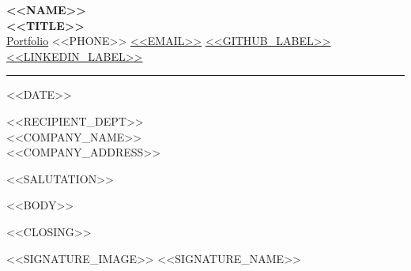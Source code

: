 \documentclass[a4paper,11pt]{letter}
\begin{document}

\begin{center}
    \textbf{\Large{<<NAME>>}} \\
    \textbf{\MakeUppercase{<<TITLE>>}} \\
    \faGlobe \hspace{2pt} \href{<<PORTFOLIO_URL>>}{Portfolio} \hspace{3pt}
    \faPhone \hspace{2pt} <<PHONE>> \hspace{3pt}
    \faEnvelope \hspace{2pt} \href{mailto:<<EMAIL>>}{<<EMAIL>>} \hspace{3pt}
    \faGithub \hspace{2pt} \href{<<GITHUB_URL>>}{<<GITHUB_LABEL>>} \hspace{3pt}
    \faLinkedin \hspace{2pt} \href{<<LINKEDIN_URL>>}{<<LINKEDIN_LABEL>>}

    \vspace{0.3cm} \hrule
\end{center}

\vspace{0.3cm}

<<DATE>>

\vspace{0.1cm}
<<RECIPIENT_DEPT>> \\
<<COMPANY_NAME>> \\
<<COMPANY_ADDRESS>>

\vspace{0.3cm}

<<SALUTATION>>

<<BODY>>

<<CLOSING>>

<<SIGNATURE_IMAGE>>
<<SIGNATURE_NAME>>
\end{document}
